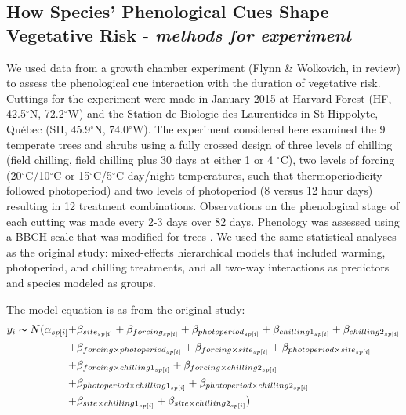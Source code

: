 \documentclass{article}\usepackage[]{graphicx}\usepackage[]{color}
\begin{document}
\subsection*{How Species' Phenological Cues Shape Vegetative Risk - \textit{methods for experiment}}
We used data from a growth chamber experiment (Flynn \& Wolkovich, in review) to assess the phenological cue interaction with the duration of vegetative risk. Cuttings for the experiment were made in January 2015 at Harvard Forest (HF, 42.5$^{\circ}$N, 72.2$^{\circ}$W) and the Station de Biologie des Laurentides in St-Hippolyte, Qu\'ebec (SH, 45.9$^{\circ}$N, 74.0$^{\circ}$W). The experiment considered here examined the 9 temperate trees and shrubs using a fully crossed design of three levels of chilling (field chilling, field chilling plus 30 days at either 1 or 4 $^{\circ}$C), two levels of forcing (20$^{\circ}$C/10$^{\circ}$C or 15$^{\circ}$C/5$^{\circ}$C day/night temperatures, such that thermoperiodicity followed photoperiod) and two levels of photoperiod (8 versus 12 hour days) resulting in 12 treatment combinations. Observations on the phenological stage of each cutting was made every 2-3 days over 82 days. Phenology was assessed using a BBCH scale that was modified for trees \citep{Finn2007}. We used the same statistical analyses as the original study: mixed-effects hierarchical models that included warming, photoperiod, and chilling treatments, and all two-way interactions as predictors and species modeled as groups.

The model equation is as from the original study:
\begin{align*}
y_i \thicksim N(\alpha_{sp[i]} +& \beta_{site_{sp[i]}} + \beta_{forcing_{sp[i]}} + \beta_{photoperiod_{sp[i]}} + \beta_{chilling1_{sp[i]}} + \beta_{chilling2_{sp[i]}}  \\
	+& \beta_{forcing \times photoperiod_{sp[i]}} + \beta_{forcing \times site_{sp[i]}} + \beta_{photoperiod \times site_{sp[i]}} \\
	+& \beta_{forcing  \times chilling1_{sp[i]}} + \beta_{forcing \times chilling2_{sp[i]}} \\
	+& \beta_{photoperiod \times chilling1_{sp[i]}} + \beta_{photoperiod \times chilling2_{sp[i]}} \\
	+& \beta_{site \times chilling1_{sp[i]}}  + \beta_{site \times chilling2_{sp[i]}} )
\end{align*}
\end{document}
